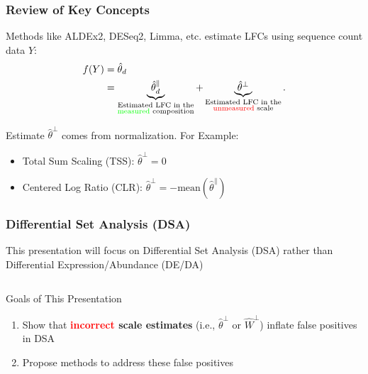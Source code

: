 \documentclass[11pt]{beamer}
\begin{document}
\begin{frame}
  \frametitle{Review of Key Concepts}

    Methods like ALDEx2, DESeq2, Limma, etc. estimate LFCs using sequence count data \(Y\):
    \begin{align*}
    f(Y) &= \hat{\theta}_d \\
    &= \underbrace{\hat{\theta}^\parallel_d}_{\substack{\text{Estimated LFC in the} \\ \text{\textcolor{green}{measured} composition}}} + \underbrace{\hat{\theta}^\perp}_{\substack{\text{Estimated LFC in the} \\ \text{\textcolor{red}{unmeasured} scale}}}.
    \end{align*}

    \pause

    Estimate \(\hat{\theta}^\perp\) comes from normalization.
    For Example:
    \begin{itemize}
      \item Total Sum Scaling (TSS): \(\hat{\theta}^\perp=0\)
      \pause
      \item Centered Log Ratio (CLR): \(\hat{\theta}^\perp=-\text{mean}(\hat{\theta}^\parallel)\)
    \end{itemize}
\end{frame}

\begin{frame}
  \frametitle{Differential Set Analysis (DSA)}

   This presentation will focus on Differential Set Analysis (DSA) rather than Differential Expression/Abundance (DE/DA)
   \begin{columns}[c]
     \begin{column}{0.5\textwidth}
        \end{column}
        \hspace{-50pt}
        \vrule{}
        \begin{column}{0.50\textwidth}
        \end{column}
   \end{columns}
   
   \begin{block}{Goals of This Presentation}
     \begin{enumerate}
       \item Show that \textbf{\textcolor{red}{incorrect} scale estimates} (i.e., \(\hat{\theta}^\perp\) or \(\hat{W}^\perp\)) inflate false positives in DSA
      \item Propose methods to address these false positives  
     \end{enumerate}
   \end{block}

\end{frame}
\end{document}
